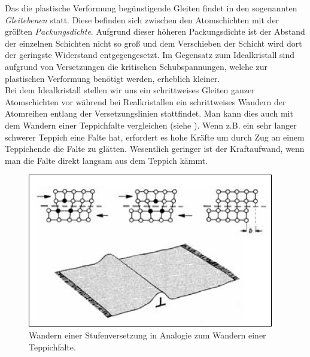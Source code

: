 \documentclass[12pt,a4paper,parskip,twoside,BCOR5mm,headsepline]{scrartcl}
\begin{document}
\begin{description*}
\begin{itemize*}
Das die plastische Verformung begünstigende Gleiten findet in den sogenannten \emph{Gleitebenen} statt. Diese befinden sich zwischen den Atomschichten mit der größten \emph{Packungsdichte}. Aufgrund dieser höheren Packungsdichte ist der Abstand der einzelnen Schichten nicht so groß und dem Verschieben der Schicht wird dort der  geringste Widerstand entgegengesetzt. Im Gegensatz zum Idealkristall sind aufgrund von Versetzungen die kritischen Schubspannungen, welche zur plastischen Verformung benötigt werden,  erheblich kleiner.\\ Bei dem Idealkristall stellen wir uns ein schrittweises Gleiten ganzer Atomschichten vor während bei Realkristallen ein schrittweises Wandern der Atomreihen entlang der Versetzungslinien stattfindet. Man kann dies auch mit dem Wandern einer Teppichfalte vergleichen (siehe ). Wenn z.B. ein sehr langer schwerer Teppich eine Falte hat,  erfordert es hohe Kräfte  um durch Zug an einem Teppichende die Falte zu glätten. Wesentlich geringer ist der Kraftaufwand,  wenn man die Falte direkt langsam aus dem Teppich kämmt. \autocite[45-53]{wk}
\begin{figure}
\centering
\includegraphics[width=.8\textwidth]{wandernstufenversetzung}
\caption[Wandern einer Stufenversetzung]{Wandern einer Stufenversetzung in Analogie zum Wandern einer Teppichfalte. \autocite[53]{wk}}
\label{fig:wandernstufenversetzung}
\end{figure}



\end{itemize*}
\end{description*}
\end{document}
